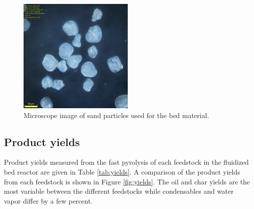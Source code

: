 \begin{figure}[H]
    \centering
    \includegraphics[width=0.5\textwidth]{figures/sand.jpg}
    \caption{Microscope image of sand particles used for the bed material.}
    \label{fig:sand}
\end{figure}

\subsection{Product yields}

Product yields measured from the fast pyrolysis of each feedstock in the fluidized bed reactor are given in Table \ref{tab:yields}. A comparison of the product yields from each feedstock is shown in Figure \ref{fig:yields}. The oil and char yields are the most variable between the different feedstocks while condensables and water vapor differ by a few percent.

